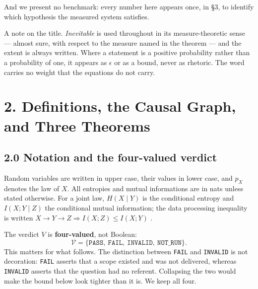\documentclass[11pt,a4paper]{article}
\begin{document}
And we present no benchmark: every number here appears once, in §3, to identify
which hypothesis the measured system satisfies.

A note on the title. \emph{Inevitable} is used throughout in its measure-theoretic
sense --- almost sure, with respect to the measure named in the theorem --- and the
extent is always written. Where a statement is a positive probability rather than
a probability of one, it appears as \(\epsilon\) or as a bound, never as rhetoric.
The word carries no weight that the equations do not carry.

\section{2. Definitions, the Causal Graph, and Three Theorems}\label{definitions-the-causal-graph-and-three-theorems}

\subsection{2.0 Notation and the four-valued verdict}\label{notation-and-the-four-valued-verdict}

Random variables are written in upper case, their values in lower case, and
\(p_X\) denotes the law of \(X\). All entropies and mutual informations are in nats
unless stated otherwise. For a joint law, \(H(X\mid Y)\) is the conditional
entropy and \(I(X;Y\mid Z)\) the conditional mutual information; the data
processing inequality is written \(X\to Y\to Z\Rightarrow I(X;Z)\le I(X;Y)\)
\cite{cover2006elements}.

The verdict \(V\) is \textbf{four-valued}, not Boolean:
\begin{equation}
\mathcal V=\{\texttt{PASS},\ \texttt{FAIL},\ \texttt{INVALID},\ \texttt{NOT\_RUN}\}.
\tag{2.0.1}
\end{equation}
This matters for what follows. The distinction between \texttt{FAIL} and \texttt{INVALID} is not
decoration: \texttt{FAIL} asserts that a scope existed and was not delivered, whereas
\texttt{INVALID} asserts that the question had no referent. Collapsing the two would
make the bound below look tighter than it is. We keep all four.
\end{document}
